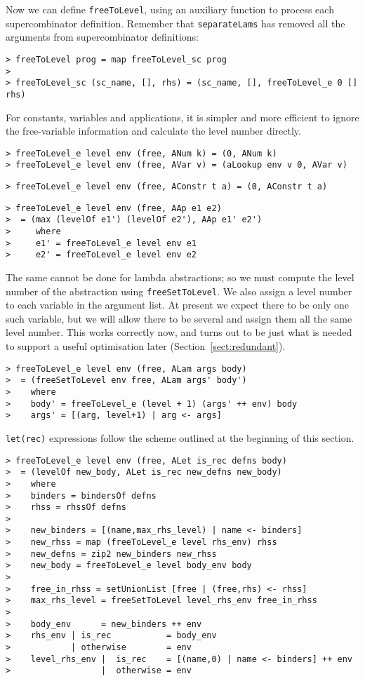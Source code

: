 Now we can define \mbox{\tt freeToLevel}, using an auxiliary function to
process each supercombinator definition.  Remember that \mbox{\tt separateLams}
has removed all the arguments from supercombinator definitions:
\begin{verbatim}
> freeToLevel prog = map freeToLevel_sc prog
>
> freeToLevel_sc (sc_name, [], rhs) = (sc_name, [], freeToLevel_e 0 [] rhs)
\end{verbatim}
%
\par
For constants, variables and applications, it is simpler and more
efficient to ignore the free-variable information and calculate the
level number directly.
\begin{verbatim}
> freeToLevel_e level env (free, ANum k) = (0, ANum k)
> freeToLevel_e level env (free, AVar v) = (aLookup env v 0, AVar v)
\end{verbatim}
\begin{verbatim}
> freeToLevel_e level env (free, AConstr t a) = (0, AConstr t a)
\end{verbatim}
\begin{verbatim}
> freeToLevel_e level env (free, AAp e1 e2)
>  = (max (levelOf e1') (levelOf e2'), AAp e1' e2')
>     where
>     e1' = freeToLevel_e level env e1
>     e2' = freeToLevel_e level env e2
\end{verbatim}
\par
The same cannot be done for lambda abstractions; so we must compute
the level number of the abstraction using \mbox{\tt freeSetToLevel}.
We also assign a level number to each variable
in the argument list.  At
present we expect there to be only one such variable, but we will
allow there to be several and assign them all the same level number.
This works correctly now, and turns out to be just what is needed to
support a useful optimisation later (Section~\ref{sect:redundant}).
\begin{verbatim}
> freeToLevel_e level env (free, ALam args body)
>  = (freeSetToLevel env free, ALam args' body')
>    where
>    body' = freeToLevel_e (level + 1) (args' ++ env) body
>    args' = [(arg, level+1) | arg <- args]
\end{verbatim}
\par
\mbox{\tt let(rec)} expressions follow the scheme outlined at the beginning of this
section.
\begin{verbatim}
> freeToLevel_e level env (free, ALet is_rec defns body)
>  = (levelOf new_body, ALet is_rec new_defns new_body)
>    where
>    binders = bindersOf defns
>    rhss = rhssOf defns
>
>    new_binders = [(name,max_rhs_level) | name <- binders]
>    new_rhss = map (freeToLevel_e level rhs_env) rhss
>    new_defns = zip2 new_binders new_rhss
>    new_body = freeToLevel_e level body_env body
>
>    free_in_rhss = setUnionList [free | (free,rhs) <- rhss]
>    max_rhs_level = freeSetToLevel level_rhs_env free_in_rhss
>
>    body_env      = new_binders ++ env
>    rhs_env | is_rec           = body_env
>            | otherwise        = env
>    level_rhs_env |  is_rec    = [(name,0) | name <- binders] ++ env
>                  |  otherwise = env
\end{verbatim}

